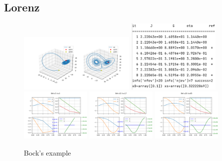 \documentclass[english,12pt,a4paper]{article}
\begin{document}
\subsection{Lorenz}\label{subsec:}
\begin{figure}[htbp]
\begin{center}
\includegraphics[keepaspectratio = true, width = 0.5\textwidth] {img/lorenz/u0_us}\hfill
\includegraphics[keepaspectratio = true, width = 0.4\textwidth] {img/osc/info}\\\vspace{5mm}
\includegraphics[keepaspectratio = true, width = 0.3\textwidth] {img/bock/iter5}\hfill
\includegraphics[keepaspectratio = true, width = 0.3\textwidth] {img/bock/iter15}\hfill
\includegraphics[keepaspectratio = true, width = 0.3\textwidth] {img/bock/iter20}
\caption{Bock's example}
\label{default}
\end{center}
\end{figure}
%
\end{document}
